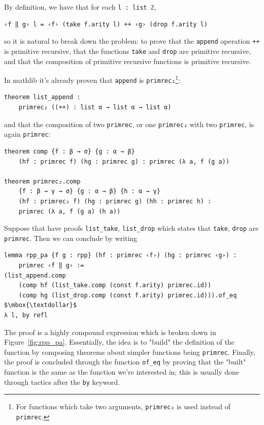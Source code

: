 \documentclass[preprint]{elsarticle}
\theoremstyle{remark}
\newcommand{\MATHLIB}{\textsf{mathlib}\xspace}
\begin{document}
By definition, we have that for each \lstinline|l : list ℤ|,

\begin{lstlisting}
‹f ‖ g› l = ‹f› (take f.arity l) ++ ‹g› (drop f.arity l)
\end{lstlisting}

so it is natural to break down the problem: to prove that the \lstinline|append| operation \lstinline|++| is primitive recursive, that the functions \lstinline|take| and \lstinline|drop| are primitive recursive, and that the composition of primitive recursive functions is primitive recursive.

In \MATHLIB it's already proven that \lstinline|append| is \lstinline|primrec₂|\footnote{For functions which take two arguments, \lstinline|primrec₂| is used instead of \lstinline|primrec|.}:

\begin{lstlisting}
theorem list_append :
    primrec₂ ((++) : list α → list α → list α)
\end{lstlisting}

and that the composition of two \lstinline|primrec|, or one \lstinline|primrec₂| with two \lstinline|primrec|, is again \lstinline|primrec|:

\begin{lstlisting}
theorem comp {f : β → σ} {g : α → β}
    (hf : primrec f) (hg : primrec g) : primrec (λ a, f (g a))

theorem primrec₂.comp
    {f : β → γ → σ} {g : α → β} {h : α → γ}
    (hf : primrec₂ f) (hg : primrec g) (hh : primrec h) :
    primrec (λ a, f (g a) (h a))
\end{lstlisting}

Suppose that have proofs \lstinline|list_take|, \lstinline|list_drop| which states that \lstinline|take|, \lstinline|drop| are \lstinline|primrec|. Then we can conclude by writing

\begin{lstlisting}
lemma rpp_pa {f g : rpp} (hf : primrec ‹f›) (hg : primrec ‹g›) :
    primrec ‹f ‖ g› :=
(list_append.comp
    (comp hf (list_take.comp (const f.arity) primrec.id))
    (comp hg (list_drop.comp (const f.arity) primrec.id))).of_eq $\mbox{\textdollar}$
λ l, by refl
\end{lstlisting}

The proof is a highly compound expression which is broken down in Figure~\ref{fig:rpp_pa}. Essentially, the idea is to "build" the definition of the function by composing theorems about simpler functions being \lstinline|primrec|. Finally, the proof is concluded through the function \lstinline|of_eq| by proving that the "built" function is the same as the function we're interested in; this is usually done through tactics after the \lstinline|by| keyword.
\end{document}
